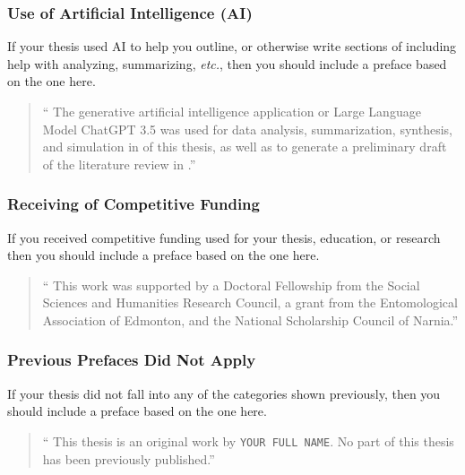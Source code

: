 			\subsubsection{Use of Artificial Intelligence (AI)}\label{preface:AI}
				If your thesis used AI to help you outline, or otherwise write sections of including help with analyzing, summarizing, \textit{etc.}, then you should include a preface based on the one here.

				\begin{quote}
					\enquote{%
						The generative artificial intelligence application or Large Language Model ChatGPT 3.5 was used for data analysis, summarization, synthesis, and simulation in  of this thesis, as well as to generate a preliminary draft of the literature review in .}
				\end{quote}

			\subsubsection{Receiving of Competitive Funding}\label{preface:CF}
				If you received competitive funding used for your thesis, education, or research then you should include a preface based on the one here.

				\begin{quote}
					\enquote{%
						This work was supported by a Doctoral Fellowship from the Social Sciences and Humanities Research Council, a grant from the Entomological Association of Edmonton, and the National Scholarship Council of Narnia.}
				\end{quote}
				
			\subsubsection{Previous Prefaces Did Not Apply}\label{preface:DNA}
				If your thesis did not fall into any of the categories shown previously, then you should include a preface based on the one here.
				

				\begin{quote}
					\enquote{%
						This thesis is an original work by \texttt{YOUR FULL NAME}. 
						No part of this thesis has been previously published.}
				\end{quote}

